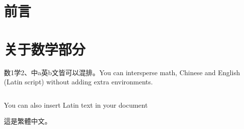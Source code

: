 \documentclass{article}
\begin{document}
\begin{CJK*}{UTF8}{gbsn}



\section{前言}

\section{关于数学部分}
数1学2、中a英b文皆可以混排。You can intersperse math, Chinese and English (Latin script) without adding extra environments.
\inputminted{c++}{varprint.cpp}
\end{CJK*}

\bigskip  %

You can also insert Latin text in your document

\bigskip  %

\begin{CJK*}{UTF8}{bsmi}
這是繁體中文。
\end{CJK*}
\end{document}
